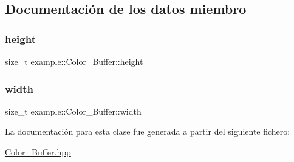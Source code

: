 \subsection{Documentación de los datos miembro}
\mbox{\label{classexample_1_1_color___buffer_ae01f4538ee30af1d3072a425c5ad37ac}} 
\subsubsection{\texorpdfstring{height}{height}}
{\footnotesize\ttfamily size\+\_\+t example\+::\+Color\+\_\+\+Buffer\+::height\hspace{0.3cm}{\ttfamily [protected]}}

\mbox{\label{classexample_1_1_color___buffer_ab61454d4b35cbba00d2e634d14ed20ac}} 
\subsubsection{\texorpdfstring{width}{width}}
{\footnotesize\ttfamily size\+\_\+t example\+::\+Color\+\_\+\+Buffer\+::width\hspace{0.3cm}{\ttfamily [protected]}}



La documentación para esta clase fue generada a partir del siguiente fichero\+:\begin{DoxyCompactItemize}
\item 
\mbox{\hyperlink{_color___buffer_8hpp}{Color\+\_\+\+Buffer.\+hpp}}\end{DoxyCompactItemize}
